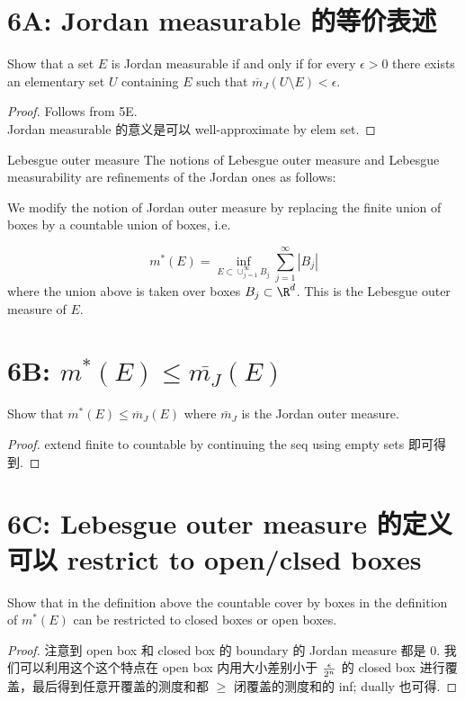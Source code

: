 \documentclass[lang=cn,11pt]{template}
\begin{document}
\section*{6A: Jordan measurable 的等价表述}
Show that a set $E$ is Jordan measurable if and only if for every $\epsilon>0$ there exists an elementary set $U$ containing $E$ such that $\overline{m}_J(U\setminus E)<\epsilon$.
\begin{proof}
    Follows from 5E.\\
    Jordan measurable 的意义是可以 well-approximate by elem set.
\end{proof}

\begin{definition}{Lebesgue outer measure}
The notions of Lebesgue outer measure and Lebesgue measurability are refinements of the Jordan ones as follows:

 We modify the notion of Jordan outer measure by replacing the finite union of boxes by a countable union of boxes, i.e.

$$
m^*(E)=\inf_{E\subset \cup_{j=1}^\infty B_j} \sum_{j=1}^\infty |B_j|
$$
where the union above is taken over boxes $B_j \subset \R^d$. This is the Lebesgue outer measure of $E$. 

\end{definition}


\section*{6B: $m^*(E) \leq \overline{m_J} (E)$}
Show that $m^*(E)\leq \overline{m}_J(E)$ where $\bar m_J$ is the Jordan outer measure. 

\begin{proof}
    extend finite to countable by continuing the seq using empty sets 即可得到.
\end{proof}


\section*{6C: Lebesgue outer measure 的定义可以 restrict to open/clsed boxes}
 Show that in the definition above the countable cover by boxes in the definition of $m^*(E)$ can be restricted to closed boxes or open boxes.
\begin{proof}
    注意到 open box 和 closed box 的 boundary 的 Jordan measure 都是 0. 我们可以利用这个这个特点在 open box 内用大小差别小于 $\epsilon \over {2^n}$ 的 closed box 进行覆盖，最后得到任意开覆盖的测度和都 $\geq$ 闭覆盖的测度和的 inf; dually 也可得. 
\end{proof}
\end{document}
